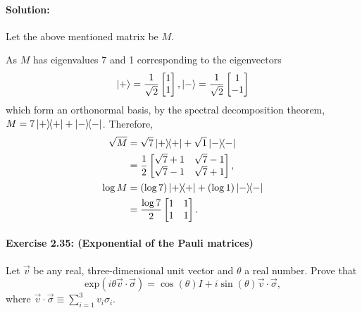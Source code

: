 \paragraph{Solution:} Let the above mentioned matrix be $M$.

As $M$ has eigenvalues 7 and 1 corresponding to the eigenvectors
\begin{equation*}
  \ket{+} = \frac{1}{\sqrt{2}}\begin{bmatrix}1 \\ 1\end{bmatrix},
  \ket{-} = \frac{1}{\sqrt{2}}\begin{bmatrix}1 \\ -1\end{bmatrix}
\end{equation*} which form an orthonormal basis, by the spectral decomposition
theorem, $M = 7\ketbra{+}{+} + \ketbra{-}{-}$. Therefore, \begin{align*}
  \sqrt{M} &= \sqrt{7}\ketbra{+}{+} + \sqrt{1}\ketbra{-}{-} \\
    &= \frac{1}{2}\begin{bmatrix}
      \sqrt{7} + 1 & \sqrt{7} - 1 \\
      \sqrt{7} - 1 & \sqrt{7} + 1
    \end{bmatrix}, \\
  \log{M} &= (\log{7})\ketbra{+}{+} + (\log{1})\ketbra{-}{-} \\
    &= \frac{\log{7}}{2}\begin{bmatrix}
      1 & 1 \\
      1 & 1
    \end{bmatrix}.
\end{align*}

\paragraph{\cite{mikeandike} Exercise 2.35: (Exponential of the Pauli matrices)
} Let $\vec{v}$ be any real, three-dimensional unit vector and $\theta$ a real
number. Prove that \begin{equation*}
  \mathrm{exp}(i \theta \vec{v} \cdot \vec{\sigma}) = \cos(\theta)I + i
    \sin(\theta)\vec{v} \cdot \vec{\sigma},
\end{equation*} where $\vec{v} \cdot \vec{\sigma} \equiv \sum_{i=1}^3 v_i
\sigma_i$.

